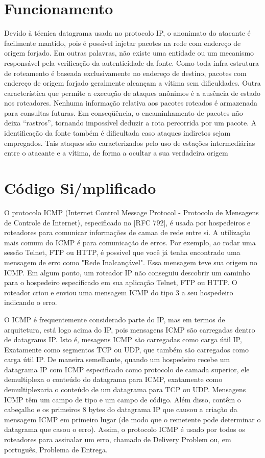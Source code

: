 \documentclass[
	article,			%
	11pt,				%
	oneside,			%
	a4paper,			%
	english,			%
	brazil,				%
	sumario=tradicional
	]{abntex2}
\begin{document}
\section{Funcionamento}
Devido à técnica datagrama usada no protocolo IP, o anonimato do atacante é
facilmente mantido, pois é possível injetar pacotes na rede com endereço de origem forjado.
Em outras palavras, não existe uma entidade ou um mecanismo responsável pela
verificação da autenticidade da fonte. Como toda infra-estrutura de roteamento é baseada
exclusivamente no endereço de destino, pacotes com endereço de origem forjado geralmente
alcançam a vítima sem dificuldades. Outra característica que permite a execução
de ataques anônimos é a ausência de estado nos roteadores. Nenhuma informação relativa
aos pacotes roteados é armazenada para consultas futuras. Em conseqüência, o encaminhamento
de pacotes não deixa “rastros”, tornando impossível deduzir a rota percorrida
por um pacote. A identificação da fonte também é dificultada caso ataques indiretos sejam
empregados. Tais ataques são caracterizados pelo uso de estações intermediárias entre o
atacante e a vítima, de forma a ocultar a sua verdadeira origem\cite{laufer2005novo}

\section{Código Si/mplificado} 
 O protocolo ICMP (Internet Control Message Protocol - Protocolo de Mensagens de Controle de Internet), especificado no [RFC 792], é usada por hospedeiros e roteadores para comunicar informaç\~oes de camaa de rede entre si. A utilização mais comum do ICMP é para comunicação de erros. Por exemplo, ao rodar uma sessão Telnet, FTP ou HTTP, é possivel que você já tenha encontrado uma mensagem de erro como "Rede Inalcançável". Essa mensagem teve sua origem no ICMP. Em algum ponto, um roteador IP não conseguiu descobrir um caminho para o hospedeiro especificado em sua aplicação Telnet, FTP ou HTTP. O roteador criou e enviou uma mensagem ICMP do tipo 3 a seu hospedeiro indicando o erro.
 
 O ICMP é frequentemente considerado parte do IP, mas em termos de arquitetura, está logo acima do IP, pois mensagens ICMP são carregadas dentro de datagrams IP. Isto é, mesagens ICMP são carregadas como carga útil IP, Exatamente como segmentos TCP ou UDP, que também são carregados como carga útil IP. De maneira semelhante, quando um hospedeiro recebe um datagrama IP com ICMP especificado como protocolo de camada superior, ele demultiplexa o conteúdo do datagrama para ICMP, exatamente como demultiplexaria o conteúdo de um datagrama para TCP ou UDP.
 Mensagens ICMP têm um campo de tipo e um campo de código. Além disso, contêm o cabeçalho e os primeiros 8 bytes do datagrama IP que causou a criação da mensagem ICMP em primeiro lugar (de modo que o remetente pode determinar o datagrama que casou o erro). Assim, o protocolo ICMP é usado por todos os roteadores para assinalar um erro, chamado de Delivery Problem ou, em português, Problema de Entrega. \cite{Kurose}
 
\end{document}
